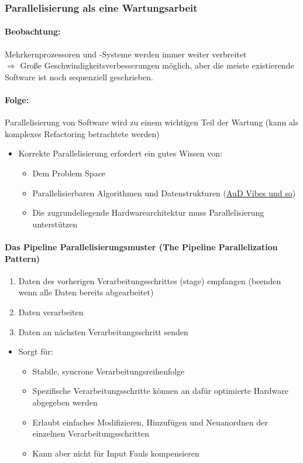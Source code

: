 \documentclass[
    ngerman,
    color=3b,
    summary,
    boxarc,
    main,
]{rubos-tuda-template}
\begin{document}
\subsubsection{Parallelisierung als eine Wartungsarbeit}
\paragraph{Beobachtung:} Mehrkernprozessoren und -Systeme werden immer weiter verbreitet\\
$\Rightarrow$ Große Geschwindigkeitsverbesserungen möglich, aber die meiste existierende Software ist noch sequenziell geschrieben.
\paragraph{Folge:} Parallelisierung von Software wird zu einem wichtigen Teil der Wartung (kann als komplexes Refactoring betrachtete werden)

\begin{itemize}
    \item Korrekte Parallelisierung erfordert ein gutes Wissen von:\begin{itemize}
              \item Dem Problem Space
              \item Parallelisierbaren Algorithmen und Datenstrukturen (\href{https://github.com/Rdeisenroth/AuD-Zusammenfassung/blob/master/AuD-Zusammenfassung-2020.pdf}{AuD Vibes und so})
              \item Die zugrundeliegende Hardwarearchitektur muss Parallelisierung unterstützen
          \end{itemize}
\end{itemize}
\paragraph{Das Pipeline Parallelisierungsmuster (The Pipeline Parallelization Pattern)}\begin{enumerate}
    \item Daten des vorherigen Verarbeitungsschrittes (stage) empfangen (beenden wenn alle Daten bereits abgearbeitet)
    \item Daten verarbeiten
    \item Daten an nächsten Verarbeitungsschritt senden
\end{enumerate}
\begin{itemize}
    \item Sorgt für:\begin{itemize}
              \item Stabile, syncrone Verarbeitungsreihenfolge
              \item Spezifische Verarbeitungsschritte können an dafür optimierte Hardware abgegeben werden
              \item Erlaubt einfaches Modifizieren, Hinzufügen und Neuanordnen der einzelnen Verarbeitungsschritten
              \item Kann aber nicht für Input Fauls kompensieren
          \end{itemize}
\end{itemize}
\clearpage
\end{document}
